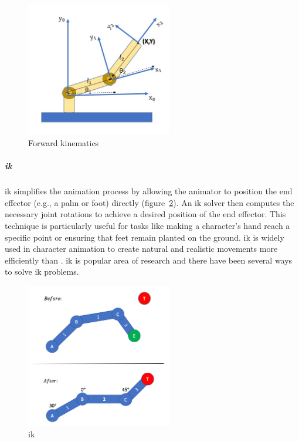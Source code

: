 \documentclass[../../main.tex]{subfiles}
\begin{document}
\begin{figure} 
  \centering \includegraphics[width = 2.5in]{chapters/background_work/images/forward_kinematics_example.png} 
  \caption{Forward kinematics} 
  \label{fig:forward_kinematics_example} 
\end{figure}

\subparagraph{\gls{ik}}
\label{ch:background_work:sign_language_synthesis:3d_techniques:avatar_animation:kinematics:inverse_kinematics}

\gls{ik} simplifies the animation process by allowing the animator to position the end effector (e.g., a palm or foot) directly (figure~\ref{fig:inverse_kinematics_example}). An \gls{ik} solver then computes the necessary joint rotations to achieve a desired position of the end effector. This technique is particularly useful for tasks like making a character’s hand reach a specific point or ensuring that feet remain planted on the ground. \gls{ik} is widely used in character animation to create natural and realistic movements more efficiently than . \gls{ik} is popular area of research and there have been several ways to solve \gls{ik} problems.

\begin{figure} 
  \centering \includegraphics[width = 2.5in]{chapters/background_work/images/inverse_kinematics_example.png} 
  \caption{\gls{ik}} 
  \label{fig:inverse_kinematics_example} 
\end{figure}
\end{document}
